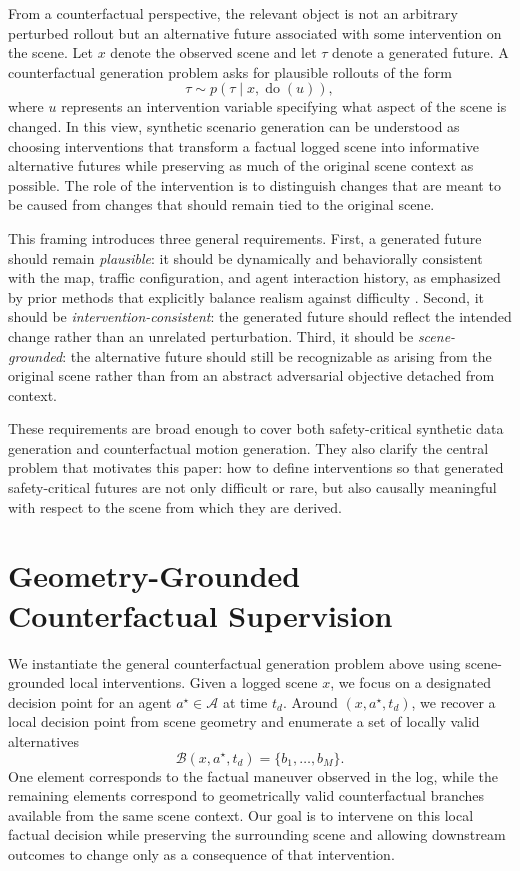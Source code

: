 \documentclass{article}
\begin{document}
From a counterfactual perspective, the relevant object is not an arbitrary perturbed rollout but an alternative future associated with some intervention on the scene. Let $x$ denote the observed scene and let $\tau$ denote a generated future. A counterfactual generation problem asks for plausible rollouts of the form
\[
\tau \sim p(\tau \mid x, \operatorname{do}(u)),
\]
where $u$ represents an intervention variable specifying what aspect of the scene is changed. In this view, synthetic scenario generation can be understood as choosing interventions that transform a factual logged scene into informative alternative futures while preserving as much of the original scene context as possible. The role of the intervention is to distinguish changes that are meant to be caused from changes that should remain tied to the original scene.

This framing introduces three general requirements. First, a generated future should remain \emph{plausible}: it should be dynamically and behaviorally consistent with the map, traffic configuration, and agent interaction history, as emphasized by prior methods that explicitly balance realism against difficulty \citep{rempe2022strive,stoler2025seal,liu2025advbmt}. Second, it should be \emph{intervention-consistent}: the generated future should reflect the intended change rather than an unrelated perturbation. Third, it should be \emph{scene-grounded}: the alternative future should still be recognizable as arising from the original scene rather than from an abstract adversarial objective detached from context.

These requirements are broad enough to cover both safety-critical synthetic data generation and counterfactual motion generation. They also clarify the central problem that motivates this paper: how to define interventions so that generated safety-critical futures are not only difficult or rare, but also causally meaningful with respect to the scene from which they are derived.

\section{Geometry-Grounded Counterfactual Supervision}
\label{sec:geometry-grounded-supervision}

We instantiate the general counterfactual generation problem above using scene-grounded local interventions. Given a logged scene $x$, we focus on a designated decision point for an agent $a^\star \in \mathcal{A}$ at time $t_d$. Around $(x,a^\star,t_d)$, we recover a local decision point from scene geometry and enumerate a set of locally valid alternatives
\[
\mathcal{B}(x,a^\star,t_d)=\{b_1,\dots,b_M\}.
\]
One element corresponds to the factual maneuver observed in the log, while the remaining elements correspond to geometrically valid counterfactual branches available from the same scene context. Our goal is to intervene on this local factual decision while preserving the surrounding scene and allowing downstream outcomes to change only as a consequence of that intervention.
\end{document}
